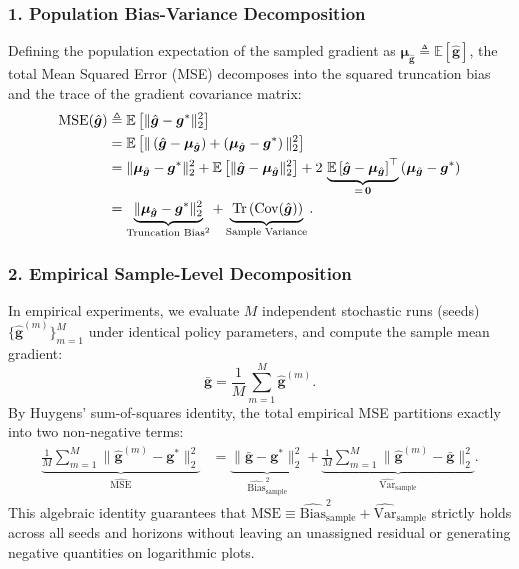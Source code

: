 \documentclass{article}
\theoremstyle{plain}
\theoremstyle{definition}
\theoremstyle{remark}
\begin{document}
\subsubsection*{1. Population Bias-Variance Decomposition}
Defining the population expectation of the sampled gradient as $\bm{\mu}_{\hat{\bm{g}}} \triangleq \mathbb{E}[\hat{\bm{g}}]$, the total Mean Squared Error (MSE) decomposes into the squared truncation bias and the trace of the gradient covariance matrix:
\begin{align}
  \mathrm{MSE}(\hat{\bm{g}}) 
  &\triangleq \mathbb{E}\left[ \|\hat{\bm{g}} - \bm{g}^*\|_2^2 \right] \nonumber \\
  &= \mathbb{E}\left[ \|\left(\hat{\bm{g}} - \bm{\mu}_{\hat{\bm{g}}}\right) + \left(\bm{\mu}_{\hat{\bm{g}}} - \bm{g}^*\right)\|_2^2 \right] \nonumber \\
  &= \|\bm{\mu}_{\hat{\bm{g}}} - \bm{g}^*\|_2^2 
     + \mathbb{E}\left[ \|\hat{\bm{g}} - \bm{\mu}_{\hat{\bm{g}}}\|_2^2 \right] 
     + 2\,\underbrace{\mathbb{E}\left[\hat{\bm{g}} - \bm{\mu}_{\hat{\bm{g}}}\right]^\top}_{=\,\bm{0}} \left(\bm{\mu}_{\hat{\bm{g}}} - \bm{g}^*\right) \nonumber \\
  &= \underbrace{\|\bm{\mu}_{\hat{\bm{g}}} - \bm{g}^*\|_2^2}_{\text{Truncation Bias}^2} 
     + \underbrace{\vphantom{\|\bm{\mu}_{\hat{\bm{g}}} - \bm{g}^*\|_2^2} \operatorname{Tr}\left(\operatorname{Cov}(\hat{\bm{g}})\right)}_{\text{Sample Variance}}. \label{eq:pop_bias_var}
\end{align}

\subsubsection*{2. Empirical Sample-Level Decomposition}
In empirical experiments, we evaluate $M$ independent stochastic runs (seeds) $\{\hat{\bm{g}}^{(m)}\}_{m=1}^M$ under identical policy parameters, and compute the sample mean gradient:
\begin{equation}
  \bar{\bm{g}} = \frac{1}{M} \sum_{m=1}^M \hat{\bm{g}}^{(m)}.
\end{equation}
By Huygens' sum-of-squares identity, the total empirical MSE partitions exactly into two non-negative terms:
\begin{align}
  \underbrace{\frac{1}{M} \sum_{m=1}^M \|\hat{\bm{g}}^{(m)} - \bm{g}^*\|_2^2}_{\widehat{\mathrm{MSE}}} 
  &= \underbrace{\|\bar{\bm{g}} - \bm{g}^*\|_2^2}_{\widehat{\mathrm{Bias}}^2_{\mathrm{sample}}} 
   + \underbrace{\frac{1}{M} \sum_{m=1}^M \|\hat{\bm{g}}^{(m)} - \bar{\bm{g}}\|_2^2}_{\widehat{\mathrm{Var}}_{\mathrm{sample}}}. \label{eq:sample_bias_var}
\end{align}
This algebraic identity guarantees that $\widehat{\mathrm{MSE}} \equiv \widehat{\mathrm{Bias}}^2_{\mathrm{sample}} + \widehat{\mathrm{Var}}_{\mathrm{sample}}$ strictly holds across all seeds and horizons without leaving an unassigned residual or generating negative quantities on logarithmic plots.
\end{document}
